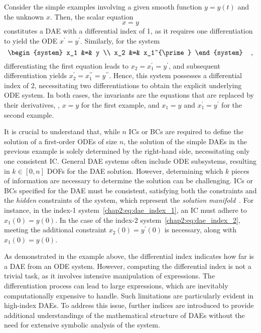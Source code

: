 \begin{example}
  Consider the simple examples involving a given smooth function $y = y(t)$ and the unknown $x$. Then, the scalar equation
  \begin{equation}
    x = y
    \label{chap2:eq:dae_index_1}
  \end{equation}
  constitutes a \ac{DAE} with a differential index of 1, as it requires one differentiation to yield the \ac{ODE} $x^{\prime} = y^{\prime}$. Similarly, for the system
  \begin{equation}
    \begin{system}
      x_1 &=& y \\
      x_2 &=& x_1^{\prime}
    \end{system} \quad \, \text{,}
    \label{chap2:eq:dae_index_2}
  \end{equation}
  differentiating the first equation leads to $x_2 = x_1^{\prime} = y^{\prime}$, and subsequent differentiation yields $x_2^{\prime} = x_1^{\prime\prime} = y^{\prime\prime}$. Hence, this system possesses a differential index of 2, necessitating two differentiations to obtain the explicit underlying \ac{ODE} system. In both cases, the invariants are the equations that are replaced by their derivatives, \ie{}, $x = y$ for the first example, and $x_1 = y$ and $x_1^{\prime} = y^{\prime}$ for the second example.
\end{example}

It is crucial to understand that, while $n$ \acp{IC} or \acp{BC} are required to define the solution of a first-order \acp{ODE} of size $n$, the solution of the simple \acp{DAE} in the previous example is solely determined by the right-hand side, necessitating only one consistent \ac{IC}. General \ac{DAE} systems often include \ac{ODE} subsystems, resulting in $k \in [0, n]$ \acp{DOF} for the \ac{DAE} solution. However, determining which $k$ pieces of information are necessary to determine the solution can be challenging. \acp{IC} or \acp{BC} specified for the \ac{DAE} must be consistent, satisfying both the constraints and the \emph{hidden} constraints of the system, which represent the \emph{solution manifold}~\cite{rheinboldt1984differential}. For instance, in the index-1 system~\eqref{chap2:eq:dae_index_1}, an \ac{IC} must adhere to $x_1(0) = y(0)$. In the case of the index-2 system~\eqref{chap2:eq:dae_index_2}, meeting the additional constraint $x_2(0) = y^{\prime}(0)$ is necessary, along with $x_1(0) = y(0)$.

As demonstrated in the example above, the differential index indicates how far is a \ac{DAE} from an \ac{ODE} system. However, computing the differential index is not a trivial task, as it involves intensive manipulation of expressions. The differentiation process can lead to large expressions, which are inevitably computationally expensive to handle. Such limitations are particularly evident in high-index \acp{DAE}. To address this issue, further indices are introduced to provide additional understandings of the mathematical structure of \acp{DAE} without the need for extensive symbolic analysis of the system.

